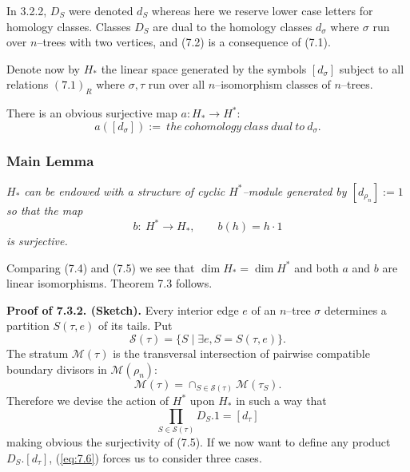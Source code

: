 \documentclass[reqno]{amsart}
\theoremstyle{definition}
\begin{document}
\smallskip

In 3.2.2, $D_S$ were denoted $d_S$ whereas here we reserve
lower case letters for homology classes. Classes $D_S$ are dual
to the homology classes $d_{\sigma}$ where $\sigma$ run over
$n$--trees with two vertices, and (7.2) is a consequence of (7.1).

\smallskip

Denote now by $H_*$ the linear space generated by the symbols
$[d_{\sigma}]$ subject to all relations $(7.1)_R$ where
$\sigma ,\tau$ run over all $n$--isomorphism classes of
$n$--trees.

\smallskip

There is an obvious surjective map $a: H_*\to H^*$:
\begin{equation*}
  a([d_{\sigma}]):=\ the\ cohomology\ class\ dual\ to\ d_{\sigma} .
  \tag{7.4}
\end{equation*}

\smallskip

\subsubsection{Main Lemma}
{\it
  $H_*$ can be endowed with a structure
  of cyclic $H^*$--module generated by $[d_{\rho_n}]:=1$
  so that the map
  \begin{equation*}
    b:\ H^*\to H_*, \qquad
    b(h)=h\cdot 1
    \tag{7.5}
  \end{equation*}
  is surjective.
}

\smallskip

Comparing (7.4) and (7.5) we see that $\dim H_*=\dim H^*$
and both $a$ and $b$ are linear isomorphisms.
Theorem 7.3 follows.

\smallskip

\textbf{Proof of 7.3.2. (Sketch).}
Every interior edge $e$ of an $n$--tree
$\sigma$ determines a partition $S(\tau , e)$ of its tails.
Put
\begin{equation*}
  \mathcal{S}(\tau )=\{ S \mid \exists e, S=S(\tau ,e)\} .
\end{equation*}
The stratum $\mathcal{M}(\tau )$ is the transversal intersection
of pairwise compatible boundary divisors in $\mathcal{M}(\rho_n):$
\begin{equation*}
  \mathcal{M}(\tau )=\cap_{S\in \mathcal{S}(\tau )}\mathcal{M}(\tau_S).
\end{equation*}
Therefore we devise the action of $H^*$ upon $H_*$ in such a way that
\begin{equation*}
  \prod_{S\in \mathcal{S}(\tau )}D_S.1=[d_{\tau}]
  \tag{7.6}
  \label{eq:7.6}
\end{equation*}
making obvious the surjectivity of (7.5). If we now want to
define any product $D_S.[d_{\tau}]$, (\ref{eq:7.6}) forces us to consider
three cases.
\end{document}
